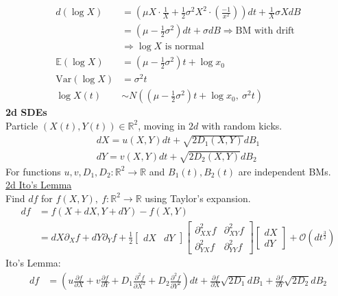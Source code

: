 \documentclass[12pt, letterpaper]{article}
\begin{document}
\begin{align*}
    d(\log X) &= (\mu X \cdot \frac 1X + \frac 12 \sigma^2X^2\cdot (\frac{-1}{x^2}))dt + \frac 1X \sigma X dB \\
    &= (\mu - \frac 12 \sigma^2)dt + \sigma dB \Rightarrow \text{BM with drift} \\
    &\Rightarrow \log X \text{ is normal} \\
    \mathbb{E}(\log X) &= (\mu-\frac 12\sigma^2)t + \log x_0 \\
    \text{Var}(\log X) &= \sigma^2 t \\
    \log X(t) &\sim N\left((\mu - \frac 12 \sigma^2)t + \log x_0,\ \sigma^2t\right)
\end{align*}
\textbf{2d SDEs} \\
 Particle $(X(t), Y(t)) \in \mathbb{R}^2$, moving in $2d$ with random kicks. \\
\begin{align*}
    dX = u(X,Y)dt + \sqrt{2D_1(X,Y)}dB_1 \\
    dY = v(X,Y)dt + \sqrt{2D_2(X,Y)}dB_2 
\end{align*}
For functions $u,v,D_1,D_2: \mathbb{R}^2 \rightarrow \mathbb{R}$ and $B_1(t), B_2(t)$ are
independent BMs. \\
\underline{2d Ito's Lemma} \\
Find $df$ for $f(X,Y),\ f:\mathbb{R}^2\rightarrow\mathbb{R}$ using Taylor's expansion.
\begin{align*}
    df &= f(X+dX, Y + dY) - f(X,Y) \\
    &= dX \partial_X f + dY\partial_Y f + \frac 12 \begin{bmatrix}
        dX & dY
    \end{bmatrix} \begin{bmatrix}
        \partial^2_{XX} f & \partial^2_{XY}f \\ \partial^2_{YX} f & \partial^2_{YY}f
    \end{bmatrix} \begin{bmatrix}
        dX \\ dY
    \end{bmatrix} + \mathcal{O}(dt^{\frac 32})
\end{align*}
Ito's Lemma: 
\begin{align*}
    df &= \left(u \frac{\partial f}{\partial X} + v \frac{\partial f}{\partial Y} + D_1 \frac{\partial^2 f}{\partial X^2} + D_2\frac{\partial^2 f}{\partial Y^2}\right)dt  + \frac{\partial f}{\partial X} \sqrt{2D_1}dB_1 + \frac{\partial f}{\partial Y} \sqrt{2D_2}dB_2
\end{align*}
\end{document}
